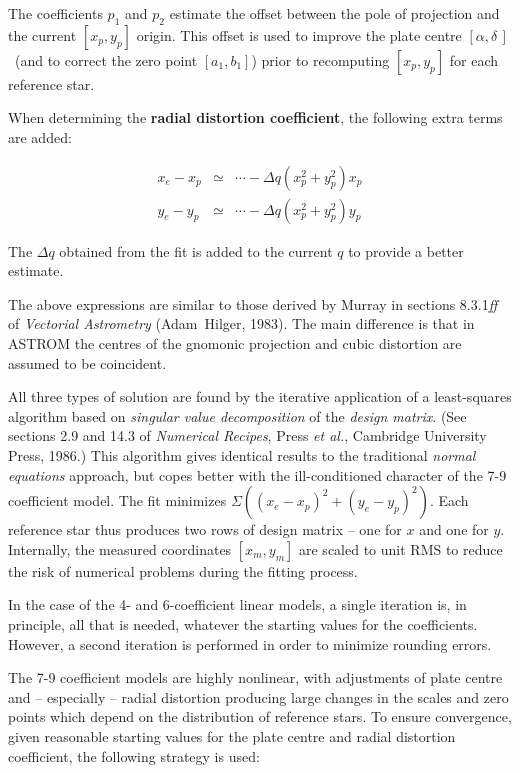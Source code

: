 \documentclass[twoside,11pt]{article}
\renewcommand{\_}{\texttt{\symbol{95}}}
\newcommand{\radec}     {$[\alpha,\delta\,]$}
\begin{document}
The coefficients $p_{1}$ and $p_{2}$ estimate the offset between the
pole of projection and the current $[x_{p},y_{p}]$ origin.  This offset
is used to improve the plate centre \radec\ (and to correct the zero
point $[a_{1},b_{1}]$) prior to recomputing $[x_{p},y_{p}]$ for each
reference star.

When determining the \textbf{radial distortion coefficient}, the
following extra terms are added:

\begin{eqnarray*}
x_{e} - x_{p} & \simeq & \cdots - \Delta q (x_{p}^{2} + y_{p}^{2}) x_{p} \\
y_{e} - y_{p} & \simeq & \cdots - \Delta q (x_{p}^{2} + y_{p}^{2}) y_{p}
\end{eqnarray*}

The $\Delta q$ obtained from the fit is added to the current $q$ to
provide a better estimate.

The above expressions are similar to those derived by Murray in sections
8.3.1\textit{ff} of \textit{Vectorial Astrometry} (Adam~Hilger,
1983).  The main difference is that in ASTROM the centres of the gnomonic
projection and cubic distortion are assumed to be coincident.

All three types of solution are found by the iterative application
of a least-squares algorithm based on \textit{singular value
decomposition} of the \textit{design matrix}.  (See sections 2.9 and
14.3 of \textit{Numerical Recipes}, Press \textit{et al.}, Cambridge
University Press, 1986.)  This algorithm gives identical results to
the traditional \textit{normal equations} approach, but copes better
with the ill-conditioned character of the 7-9 coefficient model.
The fit minimizes $\Sigma ((x_{e}-x_{p})^{2}+(y_{e}-y_{p})^{2})$.
Each reference star thus produces two rows of design matrix -- one for $x$
and one for $y$.  Internally, the measured coordinates $[x_{m},y_{m}]$
are scaled to unit RMS to reduce the risk of numerical problems during
the fitting process.

In the case of the 4- and 6-coefficient linear models, a single iteration
is, in principle, all that is needed, whatever the starting values for
the coefficients.  However, a second iteration is performed in order to
minimize rounding errors.

The 7-9 coefficient models are highly nonlinear, with adjustments of
plate centre and -- especially -- radial distortion producing large
changes in the scales and zero points which depend on the distribution
of reference stars.  To ensure convergence, given reasonable starting
values for the plate centre and radial distortion coefficient, the
following strategy is used:
\end{document}
